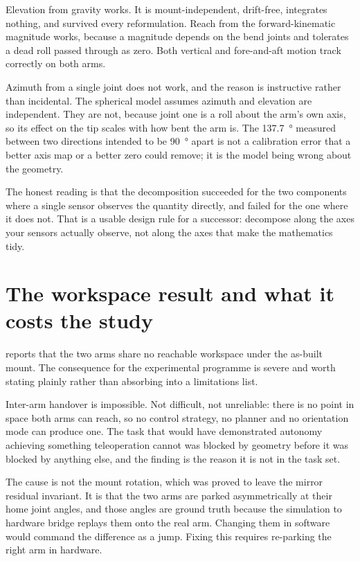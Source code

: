 Elevation from gravity works. It is mount-independent, drift-free, integrates
nothing, and survived every reformulation. Reach from the forward-kinematic
magnitude works, because a magnitude depends on the bend joints and tolerates
a dead roll passed through as zero. Both vertical and fore-and-aft motion
track correctly on both arms.

Azimuth from a single joint does not work, and the reason is instructive
rather than incidental. The spherical model assumes azimuth and elevation are
independent. They are not, because joint one is a roll about the arm's own
axis, so its effect on the tip scales with how bent the arm is. The
\SI{137.7}{\degree} measured between two directions intended to be
\SI{90}{\degree} apart is not a calibration error that a better axis map or a
better zero could remove; it is the model being wrong about the geometry.

The honest reading is that the decomposition succeeded for the two components
where a single sensor observes the quantity directly, and failed for the one
where it does not. That is a usable design rule for a successor: decompose
along the axes your sensors actually observe, not along the axes that make the
mathematics tidy.

\section{The workspace result and what it costs the study}

 reports that the two arms share no reachable workspace
under the as-built mount. The consequence for the experimental programme is
severe and worth stating plainly rather than absorbing into a limitations
list.

Inter-arm handover is impossible. Not difficult, not unreliable: there is no
point in space both arms can reach, so no control strategy, no planner and no
orientation mode can produce one. The task that would have demonstrated
autonomy achieving something teleoperation cannot was blocked by geometry
before it was blocked by anything else, and the finding is the reason it is
not in the task set.

The cause is not the mount rotation, which was proved to leave the mirror
residual invariant. It is that the two arms are parked asymmetrically at their
home joint angles, and those angles are ground truth because the simulation to
hardware bridge replays them onto the real arm. Changing them in software
would command the difference as a jump. Fixing this requires re-parking the
right arm in hardware.

